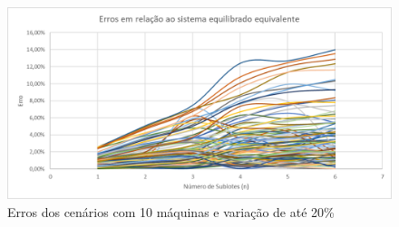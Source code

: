 \begin{figure}[!ht]
    \centering
    \includegraphics[width=12cm]{Resultados/Figuras/e10_20}
    \caption{Erros dos cenários com 10 máquinas e variação de até 20\%}
    \label{fig:e10_20}
\end{figure}